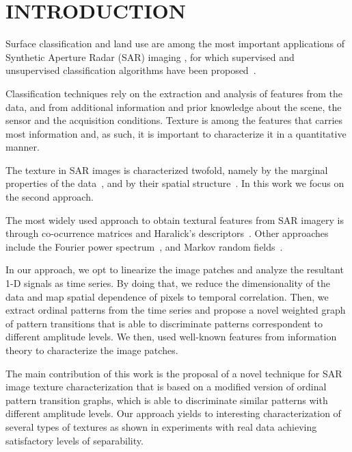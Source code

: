 \documentclass{isprs}
\begin{document}
	\section{INTRODUCTION}\label{Intro}
	
	Surface classification and land use are among the most important applications of Synthetic Aperture Radar (SAR) imaging \cite{Pottier2004Unsupervised}, for which supervised and unsupervised classification algorithms have been proposed~\cite{Bhattacharya2018Unsupervised,Chen1996multifrequency,ZYL1992Bayesian}.
	
	Classification techniques rely on the extraction and analysis of features from the data, and from additional information and prior knowledge about  the scene, the sensor and the acquisition conditions.
	Texture is among the features that carries most information and, as such, it is important to characterize it in a quantitative manner.
	
	The texture in SAR images is characterized twofold, namely by the marginal properties of the data~\cite{adrian96}, and by their spatial structure~\cite{FeaturesCropDiscrimination}.
	In this work we focus on the second approach.
	
	The most widely used approach to obtain textural features from SAR imagery is through co-ocurrence matrices and Haralick's descriptors~\cite{Zakeri2017Texture}.
	Other approaches include the Fourier power spectrum~\cite{Florindo2012Fractal}, and
	Markov random fields~\cite{Deng2005UnsupervisedSO}.
	
	In our approach, we opt to linearize the image patches and analyze the resultant 1-D signals as time series. 
	By doing that, we reduce the dimensionality of the data and map spatial dependence of pixels to temporal correlation. 
	Then, we extract ordinal patterns from the time series and propose a novel weighted graph of pattern transitions that is able to discriminate patterns correspondent to different amplitude levels. 
	We then, used well-known features from information theory to characterize the image patches. 
	
	The main contribution of this work is the proposal of a novel technique for SAR image texture characterization that is based on a modified version of ordinal pattern transition graphs, which is able to discriminate similar patterns with different amplitude levels. 
	Our approach yields to interesting characterization of several types of textures as shown in experiments with real data achieving satisfactory levels of separability.
	
\end{document}
